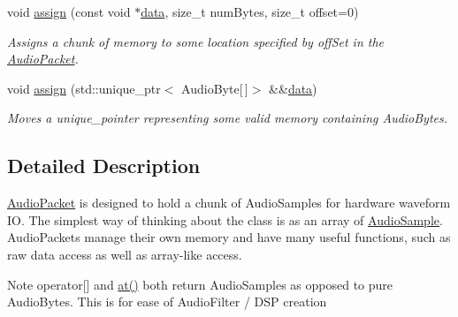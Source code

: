 \begin{DoxyCompactItemize}
void \hyperlink{class_d_x_1_1_audio_1_1_audio_packet_ad9686c0ca56c4da211514a8eadea8e5f}{assign} (const void $\ast$\hyperlink{class_d_x_1_1_audio_1_1_audio_packet_ab93eafc041e06976f99fad9d21cc19e3}{data}, size\-\_\-t num\-Bytes, size\-\_\-t offset=0)
\begin{DoxyCompactList}\small\item\em Assigns a chunk of memory to some location specified by off\-Set in the \hyperlink{class_d_x_1_1_audio_1_1_audio_packet}{Audio\-Packet}. \end{DoxyCompactList}\item 
void \hyperlink{class_d_x_1_1_audio_1_1_audio_packet_a0eef764bb6bf13de390740b1e35f04da}{assign} (std\-::unique\-\_\-ptr$<$ Audio\-Byte\mbox{[}$\,$\mbox{]}$>$ \&\&\hyperlink{class_d_x_1_1_audio_1_1_audio_packet_ab93eafc041e06976f99fad9d21cc19e3}{data})
\begin{DoxyCompactList}\small\item\em Moves a unique\-\_\-pointer representing some valid memory containing Audio\-Bytes. \end{DoxyCompactList}\end{DoxyCompactItemize}


\subsection{Detailed Description}
\hyperlink{class_d_x_1_1_audio_1_1_audio_packet}{Audio\-Packet} is designed to hold a chunk of Audio\-Samples for hardware waveform I\-O. The simplest way of thinking about the class is as an array of \hyperlink{class_d_x_1_1_audio_1_1_audio_sample}{Audio\-Sample}. Audio\-Packets manage their own memory and have many useful functions, such as raw data access as well as array-\/like access. 

\begin{DoxyNote}{Note}
operator\mbox{[}\mbox{]} and \hyperlink{class_d_x_1_1_audio_1_1_audio_packet_a279dcbea3ad12838ceb819ab9639362e}{at()} both return Audio\-Samples as opposed to pure Audio\-Bytes. This is for ease of Audio\-Filter / D\-S\-P creation 
\end{DoxyNote}


